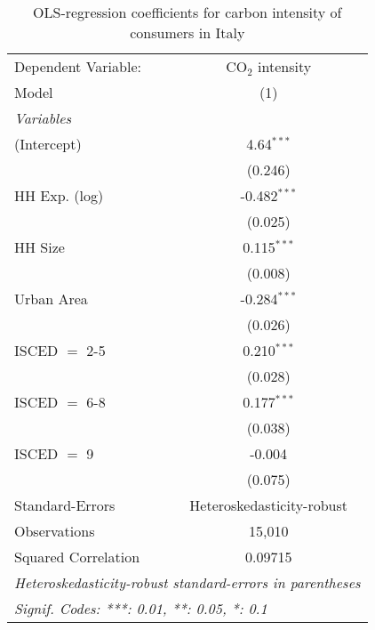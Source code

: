 
\begin{table}[htbp!]
   \centering
   \small
   \begin{adjustbox}{width = 1\textwidth, max height = 0.95\textheight, center}
      \begin{threeparttable}[b]
         \caption{\label{tab:OLS_1_ITA} OLS-regression coefficients for carbon intensity of consumers in Italy}
         \begin{tabular}{lc}
            \tabularnewline \midrule \midrule
            Dependent Variable: & CO$_{2}$ intensity\\  
            Model               & (1)\\  
            \midrule
            \emph{Variables}\\
            (Intercept)         & 4.64$^{***}$\\   
                                & (0.246)\\   
            HH Exp. (log)       & -0.482$^{***}$\\   
                                & (0.025)\\   
            HH Size             & 0.115$^{***}$\\   
                                & (0.008)\\   
            Urban Area          & -0.284$^{***}$\\   
                                & (0.026)\\   
            ISCED $=$ 2-5       & 0.210$^{***}$\\   
                                & (0.028)\\   
            ISCED $=$ 6-8       & 0.177$^{***}$\\   
                                & (0.038)\\   
            ISCED $=$ 9         & -0.004\\   
                                & (0.075)\\   
            \midrule 
            Standard-Errors     & Heteroskedasticity-robust \\   
            Observations        & 15,010\\  
            Squared Correlation & 0.09715\\  
            \midrule \midrule
            \multicolumn{2}{l}{\emph{Heteroskedasticity-robust standard-errors in parentheses}}\\
            \multicolumn{2}{l}{\emph{Signif. Codes: ***: 0.01, **: 0.05, *: 0.1}}\\
         \end{tabular}
         

\end{threeparttable}
\end{adjustbox}
\end{table}
